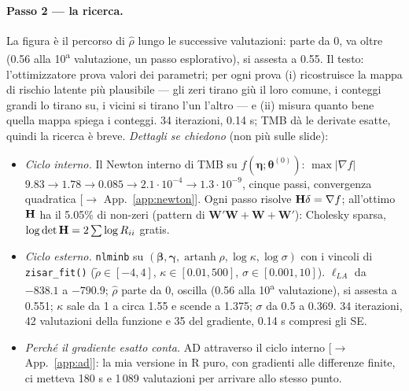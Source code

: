 \documentclass[11pt,a4paper]{article}
\newcommand{\app}[1]{{\small\color{navy}[$\to$ App.~\ref{#1}]}}
\newcommand{\bW}{\mathbf{W}}\newcommand{\bX}{\mathbf{X}}\newcommand{\bZ}{\mathbf{Z}}\newcommand{\by}{\mathbf{y}}
\newcommand{\beeta}{\boldsymbol{\eta}}\newcommand{\bbeta}{\boldsymbol{\beta}}\newcommand{\bgamma}{\boldsymbol{\gamma}}
\newcommand{\btheta}{\boldsymbol{\theta}}\newcommand{\bpi}{\boldsymbol{\pi}}\newcommand{\bmu}{\boldsymbol{\mu}}
\begin{document}
\paragraph{Passo 2 --- la ricerca.} La figura è il percorso di $\hat\rho$ lungo le successive valutazioni: parte da 0, va oltre (0.56 alla 10\textsuperscript{a} valutazione, un passo esplorativo), si assesta a 0.55. Il testo: l'ottimizzatore prova valori dei parametri; per ogni prova (i) ricostruisce la mappa di rischio latente più plausibile --- gli zeri tirano giù il loro comune, i conteggi grandi lo tirano su, i vicini si tirano l'un l'altro --- e (ii) misura quanto bene quella mappa spiega i conteggi. 34 iterazioni, 0.14 s; TMB dà le derivate esatte, quindi la ricerca è breve.
\emph{Dettagli se chiedono} (non più sulle slide):
\begin{itemize}[nosep]
\item \emph{Ciclo interno.} Il Newton interno di TMB su $f(\beeta;\btheta^{(0)})$: $\max|\nabla f|$ $9.83\to1.78\to0.085\to2.1\cdot10^{-4}\to1.3\cdot10^{-9}$, cinque passi, convergenza quadratica \app{app:newton}. Ogni passo risolve $\mathbf{H}\delta=\nabla f$; all'ottimo $\mathbf{H}$ ha il 5.05\% di non-zeri (pattern di $\bW'\bW+\bW+\bW'$): Cholesky sparsa, $\log\det\mathbf{H}=2\sum\log R_{ii}$ gratis.
\item \emph{Ciclo esterno.} \texttt{nlminb} su $(\bbeta,\bgamma,\operatorname{artanh}\rho,\log\kappa,\log\sigma)$ con i vincoli di \texttt{zisar\_fit()} ($\tilde\rho\in[-4,4]$, $\kappa\in[0.01,500]$, $\sigma\in[0.001,10]$). $\ell_{LA}$ da $-838.1$ a $-790.9$; $\hat\rho$ parte da 0, oscilla (0.56 alla 10\textsuperscript{a} valutazione), si assesta a 0.551; $\kappa$ sale da 1 a circa 1.55 e scende a 1.375; $\sigma$ da 0.5 a 0.369. 34 iterazioni, 42 valutazioni della funzione e 35 del gradiente, 0.14 s compresi gli SE.
\item \emph{Perché il gradiente esatto conta.} AD attraverso il ciclo interno \app{app:ad}: la mia versione in R puro, con gradienti alle differenze finite, ci metteva 180 s e 1\,089 valutazioni per arrivare allo stesso punto.
\end{itemize}
\end{document}
